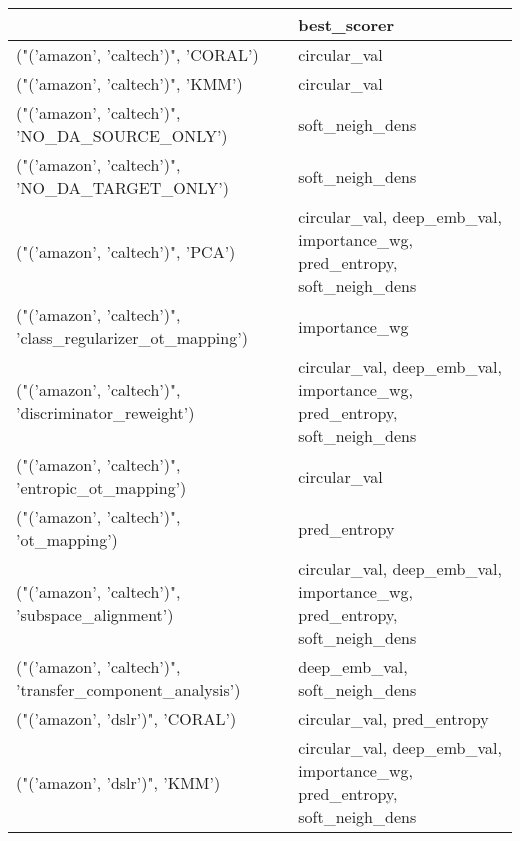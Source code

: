 \begin{tabular}{ll}
\hline
                                                           & best\_scorer                                                              \\
\hline
 ("('amazon', 'caltech')", 'CORAL')                        & circular\_val                                                             \\
 ("('amazon', 'caltech')", 'KMM')                          & circular\_val                                                             \\
 ("('amazon', 'caltech')", 'NO\_DA\_SOURCE\_ONLY')            & soft\_neigh\_dens                                                          \\
 ("('amazon', 'caltech')", 'NO\_DA\_TARGET\_ONLY')            & soft\_neigh\_dens                                                          \\
 ("('amazon', 'caltech')", 'PCA')                          & circular\_val, deep\_emb\_val, importance\_wg, pred\_entropy, soft\_neigh\_dens \\
 ("('amazon', 'caltech')", 'class\_regularizer\_ot\_mapping') & importance\_wg                                                            \\
 ("('amazon', 'caltech')", 'discriminator\_reweight')       & circular\_val, deep\_emb\_val, importance\_wg, pred\_entropy, soft\_neigh\_dens \\
 ("('amazon', 'caltech')", 'entropic\_ot\_mapping')          & circular\_val                                                             \\
 ("('amazon', 'caltech')", 'ot\_mapping')                   & pred\_entropy                                                             \\
 ("('amazon', 'caltech')", 'subspace\_alignment')           & circular\_val, deep\_emb\_val, importance\_wg, pred\_entropy, soft\_neigh\_dens \\
 ("('amazon', 'caltech')", 'transfer\_component\_analysis')  & deep\_emb\_val, soft\_neigh\_dens                                            \\
 ("('amazon', 'dslr')", 'CORAL')                           & circular\_val, pred\_entropy                                               \\
 ("('amazon', 'dslr')", 'KMM')                             & circular\_val, deep\_emb\_val, importance\_wg, pred\_entropy, soft\_neigh\_dens \\

\end{tabular}
